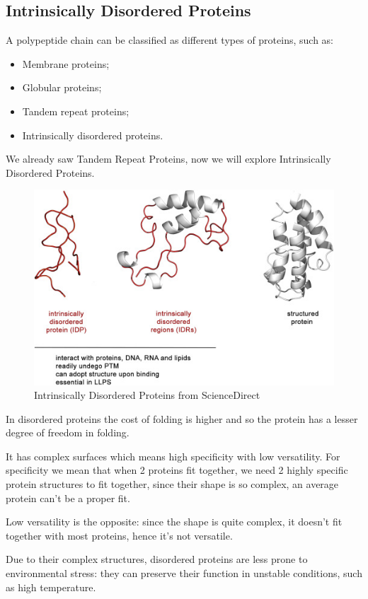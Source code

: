 \subsection{Intrinsically Disordered Proteins}
A polypeptide chain can be classified as different types of proteins, such as:
\begin{itemize}
	\item Membrane proteins;
	\item Globular proteins;
	\item Tandem repeat proteins;
	\item Intrinsically disordered proteins.
\end{itemize}
We already saw Tandem Repeat Proteins, now we will explore Intrinsically Disordered Proteins.

\begin{figure}[h!]
	\includegraphics[scale=0.8]{res/proteins_overview/disordered.png}
	\centering
	\caption{Intrinsically Disordered Proteins from ScienceDirect \cite{intrinsic}}
	\label{fig:tandem}
\end{figure}
In disordered proteins the cost of folding is higher and so the protein has a lesser degree of freedom in folding.

It has complex surfaces which means high specificity with low versatility. For specificity we mean that when 2 proteins fit together, we need 2 highly specific protein structures to fit together, since their shape is so complex, an average protein can't be a proper fit.

Low versatility is the opposite: since the shape is quite complex, it doesn't fit together with most proteins, hence it's not versatile.

Due to their complex structures, disordered proteins are less prone to environmental stress: they can preserve their function in unstable conditions, such as high temperature.

